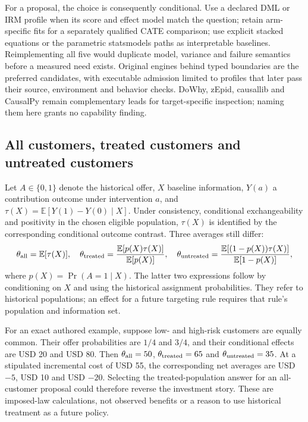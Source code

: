 For a proposal, the choice is consequently conditional. Use a declared DML
or IRM profile when its score and effect model match the question; retain
arm-specific fits for a separately qualified CATE comparison; use explicit
stacked equations or the parametric statsmodels paths as interpretable
baselines. Reimplementing all five would duplicate model, variance and
failure semantics before a measured need exists. Original engines behind
typed boundaries are the preferred candidates, with executable admission
limited to profiles that later pass their source, environment and behavior
checks. DoWhy, zEpid, causallib and CausalPy remain complementary leads for
target-specific inspection; naming them here grants no capability finding.

\subsection{All customers, treated customers and untreated customers}
\label{exec20:pyfx-population}
Let $A\in\{0,1\}$ denote the historical offer, $X$ baseline information,
$Y(a)$ a contribution outcome under intervention $a$, and
$\tau(X)=\mathbb E[Y(1)-Y(0)\mid X]$. Under consistency, conditional
exchangeability and positivity in the chosen eligible population,
$\tau(X)$ is identified by the corresponding conditional outcome contrast.
Three averages still differ:
\begin{equation}
 \theta_{\rm all}=\mathbb E[\tau(X)],\quad
 \theta_{\rm treated}=\frac{\mathbb E[p(X)\tau(X)]}{\mathbb E[p(X)]},\quad
 \theta_{\rm untreated}=\frac{\mathbb E[(1-p(X))\tau(X)]}{\mathbb E[1-p(X)]},
 \label{exec20:pyfx-targets}
\end{equation}
where $p(X)=\Pr(A=1\mid X)$. The latter two expressions follow by conditioning
on $X$ and using the historical assignment probabilities. They refer to
historical populations; an effect for a future targeting rule requires that
rule's population and information set.

For an exact authored example, suppose low- and high-risk customers are
equally common. Their offer probabilities are $1/4$ and $3/4$, and their
conditional effects are USD 20 and USD 80. Then
$\theta_{\rm all}=50$, $\theta_{\rm treated}=65$ and
$\theta_{\rm untreated}=35$. At a stipulated incremental cost of USD 55,
the corresponding net averages are USD $-5$, USD 10 and USD $-20$.
Selecting the treated-population answer for an all-customer proposal could
therefore reverse the investment story. These are imposed-law calculations,
not observed benefits or a reason to use historical treatment as a future
policy.~\citep{exec20_python_effect_reference}

